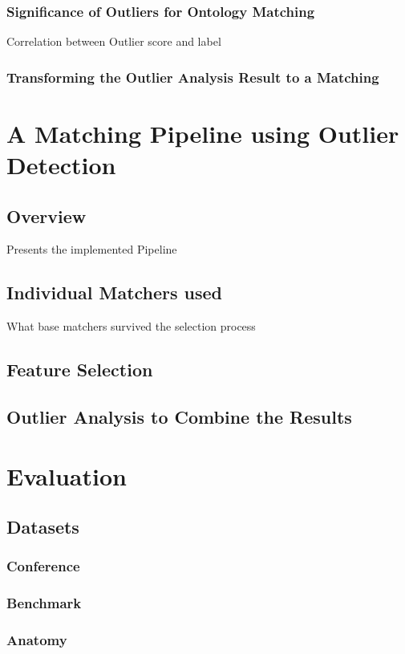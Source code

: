 \documentclass[11pt,titlepage,oneside,openany,a4paper]{report}
\begin{document}
\subsection{Significance of Outliers for Ontology Matching}
Correlation between Outlier score and label
\subsection{Transforming the Outlier Analysis Result to a Matching}


\chapter{A Matching Pipeline using Outlier Detection}

\section{Overview}
Presents the implemented Pipeline
\section{Individual Matchers used}
What base matchers survived the selection process
\section{Feature Selection}

\section{Outlier Analysis  to Combine the Results}



\chapter{Evaluation}
\section{Datasets}
\subsection{Conference}
\subsection{Benchmark}
\subsection{Anatomy}
\end{document}
